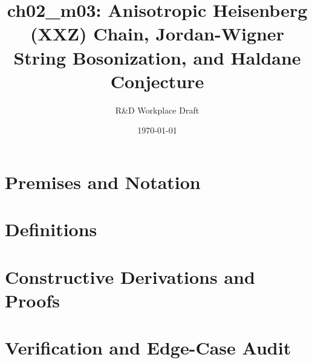 \documentclass[11pt,a4paper]{article}
\title{\textbf{ch02\_m03: Anisotropic Heisenberg (XXZ) Chain, Jordan-Wigner String Bosonization, and Haldane Conjecture}}
\author{R\&D Workplace Draft}
\date{\today}
\theoremstyle{definition}
\theoremstyle{plain}
\theoremstyle{remark}
\begin{document}
\maketitle

\section{Premises and Notation}

\section{Definitions}

\section{Constructive Derivations and Proofs}

\section{Verification and Edge-Case Audit}
\end{document}
